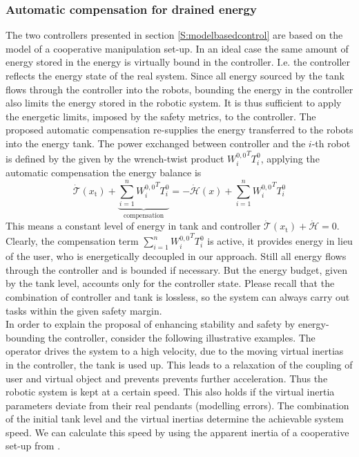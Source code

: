 \documentclass[a4paper,twoside, openright,12pt]{report}
\newcommand{\g}[1]{\text{#1}}
\begin{document}
{\subsubsection{Automatic compensation for drained energy}
The two controllers presented in section \ref{S:modelbasedcontrol} are based on the model of a cooperative manipulation set-up. In an ideal case the same amount of energy stored in the energy is virtually bound in the controller. I.e. the controller reflects the energy state of the real system. Since all energy sourced by the tank flows through the controller into the robots, bounding the energy in the controller also limits the energy stored in the robotic system.
It is thus sufficient to apply the energetic limits, imposed by the safety metrics, to the controller. The proposed automatic compensation re-supplies the energy transferred to the robots into the energy tank. 
The power exchanged between controller and the $i$-th robot is defined by the given by the wrench-twist product ${W_i^{0,0}}^T T_i^0$, applying the automatic compensation the energy balance is
\begin{equation}
\dot{\mathcal{T}}(x_\g{t}) + \underbrace{\sum_{i=1}^n {W_i^{0,0}}^T T_i^0}_{\text{compensation}} = - \dot{{\mathcal{H}}}(x) + \sum_{i=1}^n {W_i^{0,0}}^T T_i^0
\end{equation}
This means a constant level of energy in tank and controller $\dot{\mathcal{T}}(x_\g{t})+\dot{\mathcal{H}} = 0$.
Clearly, the compensation term $\sum_{i=1}^n {W_i^{0,0}}^T T_i^0$ is active, it provides energy in lieu of the user, who is energetically decoupled in our approach. Still all energy flows through the controller and is bounded if necessary. But the energy budget, given by the tank level, accounts only for the controller state. Please recall that the combination of controller and tank is lossless, so the system can always carry out tasks within the given safety margin.\\ 
In order to explain the proposal of enhancing stability and safety by energy-bounding the controller, consider the following illustrative examples.
The operator drives the system to a high velocity, due to the moving virtual inertias in the controller, the tank is used up. This leads to a relaxation of the coupling of user and virtual object and prevents prevents further acceleration. Thus the robotic system is kept at a certain speed. This also holds if the virtual inertia parameters deviate from their real pendants (modelling errors). The combination of the initial tank level and the virtual inertias determine the achievable system speed. We can calculate this speed by using the apparent inertia of a cooperative set-up from \cite{Erhart_16}.\\ 
}
\end{document}
